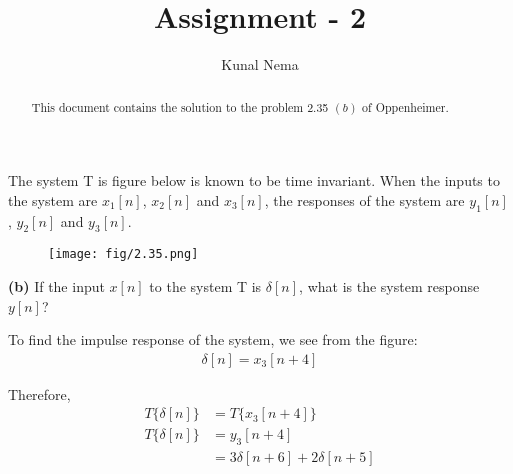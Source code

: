 \documentclass[journal,12pt,twocolumn]{IEEEtran}
\begin{document}
\title{Assignment - 2}
\author{Kunal Nema}
\maketitle

\bigskip 
\begin{abstract}
    This document contains the solution to the problem 2.35 $(b)$ of Oppenheimer.
\end{abstract}

\problem The system T is figure below is known to be time invariant. When the inputs to the system are $x_1[n]$, $x_2[n]$ and $x_3[n]$, the responses of the system are $y_1[n]$, $y_2[n]$ and $y_3[n]$. \\
\begin{figure}[!ht]
    \centering
    \texttt{[image: fig/2.35.png]}
\end{figure}

\textbf{(b)} If the input $x[n]$ to the system T is $\delta[n]$, what is the system response $y[n]$?

\solution To find the impulse response of the system, we see from the figure:
\begin{align}
    \delta[n] = x_3[n+4]
\end{align}

Therefore,
\begin{align}
    T{\{\delta[n]\}} &= T{\{x_3[n+4]\}} \\
    T{\{\delta[n]\}} &= y_3[n+4] \\
    &= 3\delta[n+6] + 2\delta[n+5]
\end{align}
\end{document}
